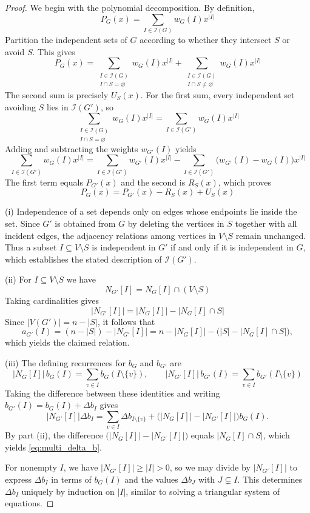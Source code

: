 \documentclass[11pt,a4paper]{article}
\numberwithin{equation}{section}
\theoremstyle{plain}
\theoremstyle{definition}
\theoremstyle{remark}
\begin{document}
\begin{proof}
We begin with the polynomial decomposition.
By definition,
\[
P_G(x)
=
\sum_{I\in\mathcal I(G)} w_G(I)x^{|I|}
\]
Partition the independent sets of $G$ according to whether they
intersect $S$ or avoid $S$. This gives
\[
P_G(x)
=
\sum_{\substack{I\in\mathcal I(G)\\ I\cap S=\varnothing}}
w_G(I)x^{|I|}
+
\sum_{\substack{I\in\mathcal I(G)\\ I\cap S\neq\varnothing}}
w_G(I)x^{|I|}
\]
The second sum is precisely $U_S(x)$.
For the first sum, every independent set avoiding $S$
lies in $\mathcal I(G')$, so
\[
\sum_{\substack{I\in\mathcal I(G)\\ I\cap S=\varnothing}}
w_G(I)x^{|I|}
=
\sum_{I\in\mathcal I(G')} w_G(I)x^{|I|}
\]
Adding and subtracting the weights $w_{G'}(I)$ yields
\[
\sum_{I\in\mathcal I(G')} w_G(I)x^{|I|}
=
\sum_{I\in\mathcal I(G')} w_{G'}(I)x^{|I|}
-
\sum_{I\in\mathcal I(G')}
\bigl(w_{G'}(I)-w_G(I)\bigr)x^{|I|}
\]
The first term equals $P_{G'}(x)$ and the second is $R_S(x)$,
which proves
\[
P_G(x)=P_{G'}(x)-R_S(x)+U_S(x)
\]

\medskip

(i)
Independence of a set depends only on edges whose endpoints lie inside
the set. Since $G'$ is obtained from $G$ by deleting the vertices in $S$
together with all incident edges, the adjacency relations among
vertices in $V\setminus S$ remain unchanged. Thus a subset
$I\subseteq V\setminus S$ is independent in $G'$ if and only if it is
independent in $G$, which establishes the stated description of
$\mathcal I(G')$.

\medskip

(ii)
For $I\subseteq V\setminus S$ we have
\[
N_{G'}[I]=N_G[I]\cap (V\setminus S)
\]
Taking cardinalities gives
\[
|N_{G'}[I]|
=
|N_G[I]|-|N_G[I]\cap S|
\]
Since $|V(G')|=n-|S|$, it follows that
\[
a_{G'}(I)
=
(n-|S|)-|N_{G'}[I]|
=
n-|N_G[I]|-\bigl(|S|-|N_G[I]\cap S|\bigr),
\]
which yields the claimed relation.

\medskip

(iii)
The defining recurrences for $b_G$ and $b_{G'}$ are
\[
|N_G[I]|\,b_G(I)
=
\sum_{v\in I} b_G(I\setminus\{v\}),
\qquad
|N_{G'}[I]|\,b_{G'}(I)
=
\sum_{v\in I} b_{G'}(I\setminus\{v\})
\]
Taking the difference between these identities and writing
$b_{G'}(I)=b_G(I)+\Delta b_I$ gives
\[
|N_{G'}[I]|\Delta b_I
=
\sum_{v\in I}\Delta b_{I\setminus\{v\}}
+
\bigl(|N_G[I]|-|N_{G'}[I]|\bigr)b_G(I).
\]
By part (ii), the difference $\bigl(|N_G[I]|-|N_{G'}[I]|\bigr)$ equals $|N_G[I]\cap S|$,
which yields \eqref{eq:multi_delta_b}.

For nonempty $I$, we have $|N_{G'}[I]|\ge |I|>0$, so we may divide by $|N_{G'}[I]|$ to express $\Delta b_I$ in terms of $b_G(I)$ and the values $\Delta b_J$ with $J\subsetneq I$. This determines $\Delta b_I$ uniquely by induction on $|I|$, similar to solving a triangular system of equations.
\end{proof}
\end{document}
